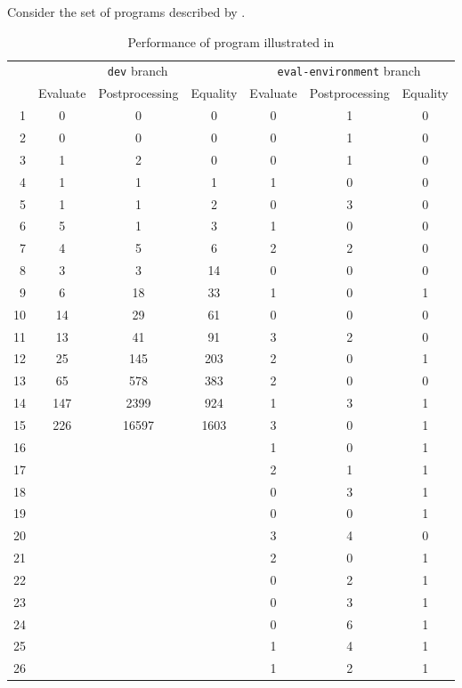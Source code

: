 Consider the set of programs described by .


\begin{singlespace}
  \begin{table}
    \centering
    \begin{tabular}{r|ccc|ccc}
      \hline
      & \multicolumn{3}{c|}{\texttt{dev} branch} & \multicolumn{3}{c}{\texttt{eval-environment} branch} \\
      & Evaluate & Postprocessing & Equality & Evaluate & Postprocessing & Equality \\
      \hline\hline
      1 & 0 & 0 & 0 & 0 & 1 & 0 \\
      2 & 0 & 0 & 0 & 0 & 1 & 0 \\
      3 & 1 & 2 & 0 & 0 & 1 & 0 \\
      4 & 1 & 1 & 1 & 1 & 0 & 0 \\
      5 & 1 & 1 & 2 & 0 & 3 & 0 \\
      6 & 5 & 1 & 3 & 1 & 0 & 0 \\
      7 & 4 & 5 & 6 & 2 & 2 & 0 \\
      8 & 3 & 3 & 14 & 0 & 0 & 0 \\
      9 & 6 & 18 & 33 & 1 & 0 & 1 \\
      10 & 14 & 29 & 61 & 0 & 0 & 0 \\
      11 & 13 & 41 & 91 & 3 & 2 & 0 \\
      12 & 25 & 145 & 203 & 2 & 0 & 1 \\
      13 & 65 & 578 & 383 & 2 & 0 & 0 \\
      14 & 147 & 2399 & 924 & 1 & 3 & 1 \\
      15 & 226 & 16597 & 1603 & 3 & 0 & 1 \\
      16 & & & & 1 & 0 & 1 \\
      17 & & & & 2 & 1 & 1 \\
      18 & & & & 0 & 3 & 1 \\
      19 & & & & 0 & 0 & 1 \\
      20 & & & & 3 & 4 & 0 \\
      21 & & & & 2 & 0 & 1 \\
      22 & & & & 0 & 2 & 1 \\
      23 & & & & 0 & 3 & 1 \\
      24 & & & & 0 & 6 & 1 \\
      25 & & & & 1 & 4 & 1 \\
      26 & & & & 1 & 2 & 1 \\
      \hline\hline
    \end{tabular}
    \caption{Performance of program illustrated in }
    \label{tab:perf-hole-blowup}
  \end{table}
\end{singlespace}

